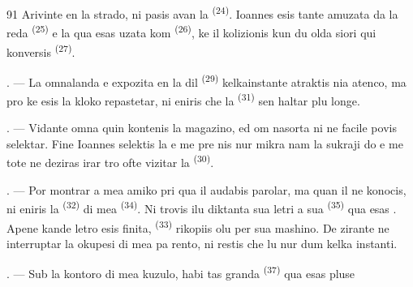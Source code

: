 \begin{VUpage}[93]{91}
\VUblancAlinea
Arivinte en la strado, ni pasis avan la \cc
{} \textsuperscript{(24)}. Ioannes esis tante amuzata da la\nl
reda  \textsuperscript{(25)} e la  qua esas uzata\nl
kom  \textsuperscript{(26)}, ke il kolizionis kun du olda\nl
siori qui konversis  \textsuperscript{(27)}.

\VUsaut{3.0mm}

. --- La omnalanda  e \cc
{} expozita en la  dil  \textsuperscript{(29)}\nl
kelkainstante atraktis nia atenco, ma pro ke\nl
esis la kloko repastetar, ni eniris che la \cc
{} \textsuperscript{(31)} sen haltar plu longe.

. --- Vidante omna  quin kontenis\nl
la magazino,  ed om\cc
nasorta  ni ne facile povis selektar.\nl
Fine Ioannes selektis la  e me pre\cc
nis nur mikra  nam la sukraji do\cc
{} e me tote ne deziras irar tro\nl
ofte vizitar la  \textsuperscript{(30)}.

\VUsaut{3.0mm}

. --- Por montrar a mea amiko \cc
{} pri qua il audabis parolar, ma quan\nl
il ne konocis, ni eniris la  \textsuperscript{(32)}\nl
di mea  \textsuperscript{(34)}. Ni trovis ilu diktanta sua\nl
letri a sua  \textsuperscript{(35)} qua esas \cc
{}. Apene kande letro esis finita, \cc
{} \textsuperscript{(33)} rikopiis olu per sua mashino. De\cc
zirante ne interruptar la okupesi di mea pa\cc
rento, ni restis che lu nur dum kelka instanti.

. --- Sub la kontoro di mea kuzulo, habi\cc
tas granda  \textsuperscript{(37)} qua esas pluse
\parplein
\end{VUpage}


